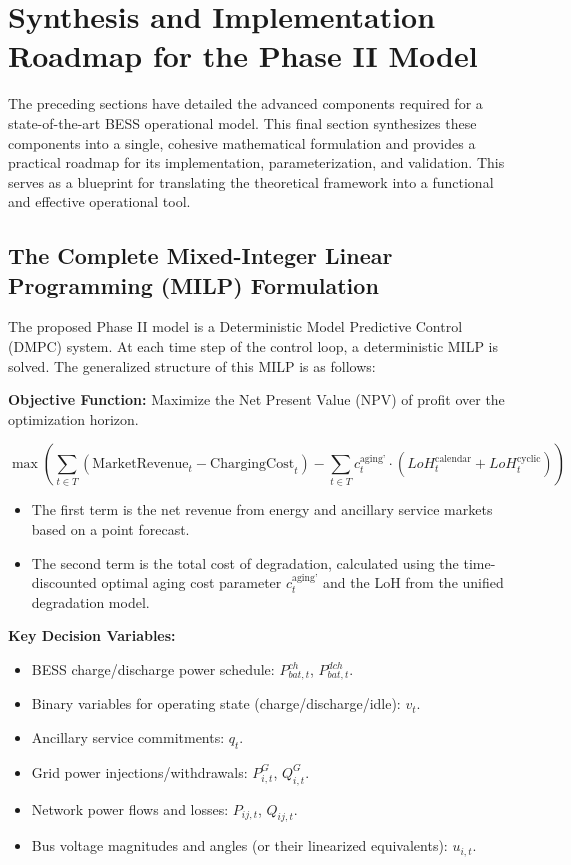 \section{Synthesis and Implementation Roadmap for the Phase II Model}

The preceding sections have detailed the advanced components required for a state-of-the-art BESS operational model. This final section synthesizes these components into a single, cohesive mathematical formulation and provides a practical roadmap for its implementation, parameterization, and validation. This serves as a blueprint for translating the theoretical framework into a functional and effective operational tool.

\subsection{The Complete Mixed-Integer Linear Programming (MILP) Formulation}

The proposed Phase II model is a Deterministic Model Predictive Control (DMPC) system. At each time step of the control loop, a deterministic MILP is solved. The generalized structure of this MILP is as follows:

\textbf{Objective Function:}
Maximize the Net Present Value (NPV) of profit over the optimization horizon.

\begin{equation}
\max \left( \sum_{t \in T} (\text{MarketRevenue}_t - \text{ChargingCost}_t) - \sum_{t \in T} c_{t}^{\text{aging'}} \cdot (LoH_{t}^{\text{calendar}} + LoH_{t}^{\text{cyclic}}) \right)
\end{equation}

\begin{itemize}
    \item The first term is the net revenue from energy and ancillary service markets based on a point forecast.
    \item The second term is the total cost of degradation, calculated using the time-discounted optimal aging cost parameter $c_{t}^{\text{aging'}}$ and the LoH from the unified degradation model.
\end{itemize}

\textbf{Key Decision Variables:}
\begin{itemize}
    \item BESS charge/discharge power schedule: $P_{bat,t}^{ch}$, $P_{bat,t}^{dch}$.
    \item Binary variables for operating state (charge/discharge/idle): $v_t$.
    \item Ancillary service commitments: $q_t$.
    \item Grid power injections/withdrawals: $P_{i,t}^{G}$, $Q_{i,t}^{G}$.
    \item Network power flows and losses: $P_{ij,t}$, $Q_{ij,t}$.
    \item Bus voltage magnitudes and angles (or their linearized equivalents): $u_{i,t}$.
\end{itemize}

